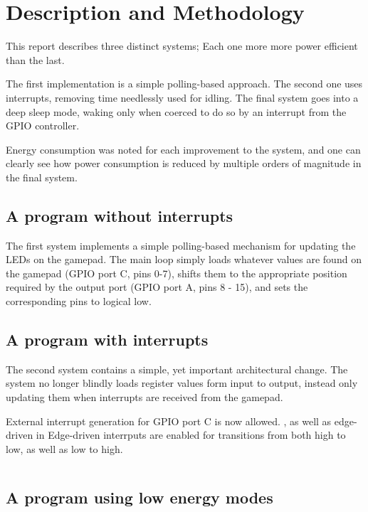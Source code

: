 \section{Description and Methodology}

This report describes three distinct systems; Each one more more power efficient than the last.

The first implementation is a simple polling-based approach. The second one uses interrupts, removing time needlessly used for idling. The final system goes into a deep sleep mode, waking only when coerced to do so by an interrupt from the GPIO controller.

Energy consumption was noted for each improvement to the system, and one can clearly see how power consumption is reduced by multiple orders of magnitude in the final system.

\subsection{A program without interrupts}

The first system implements a simple polling-based mechanism for updating the LEDs on the gamepad. The main loop simply loads whatever values are found on the gamepad (GPIO port C, pins 0-7), shifts them to the appropriate position required by the output port (GPIO port A, pins 8 - 15), and sets the corresponding pins to logical low.

\subsection{A program with interrupts}

The second system contains a simple, yet important architectural change. The system no longer blindly loads register values form input to output, instead only updating them when interrupts are received from the gamepad.

External interrupt generation for GPIO port C is now allowed. , as well as edge-driven in
Edge-driven interrputs are enabled for transitions from both high to low, as well as low to high.

\begin{lstlisting}
\end{lstlisting}


\subsection{A program using low energy modes}


